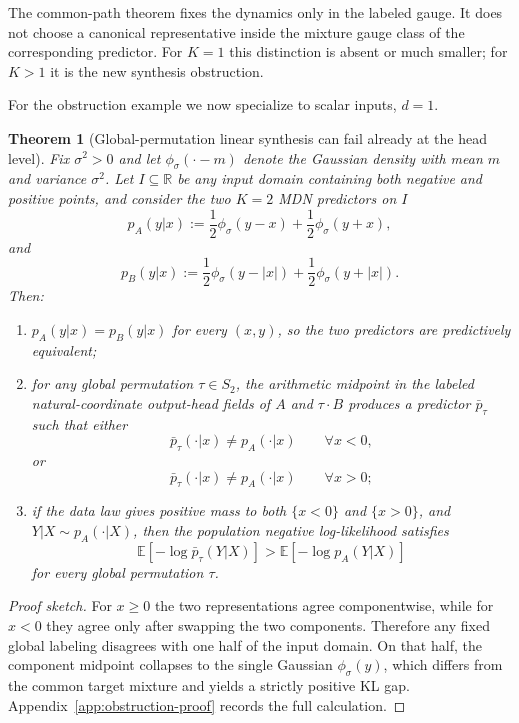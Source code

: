 \documentclass[11pt]{article}
\newtheorem{theorem}{Theorem}
\theoremstyle{definition}
\newcommand{\R}{\mathbb{R}}
\newcommand{\E}{\mathbb{E}}
\begin{document}
The common-path theorem fixes the dynamics only in the labeled gauge. It does
not choose a canonical representative inside the mixture gauge class of the
corresponding predictor. For $K=1$ this distinction is absent or much smaller;
for $K>1$ it is the new synthesis obstruction.

\noindent
For the obstruction example we now specialize to scalar inputs, $d=1$.

\begin{theorem}[Global-permutation linear synthesis can fail already at the head level]
\label{thm:mdn-obstruction}
Fix $\sigma^2>0$ and let $\phi_\sigma(\cdot-m)$ denote the Gaussian density
with mean $m$ and variance $\sigma^2$. Let $I\subseteq \R$ be any input domain
containing both negative and positive points, and consider the two $K=2$ MDN
predictors on $I$
\[
  p_A(y|x)
  :=
  \frac12 \phi_\sigma(y-x)+\frac12 \phi_\sigma(y+x),
\]
and
\[
  p_B(y|x)
  :=
  \frac12 \phi_\sigma(y-|x|)+\frac12 \phi_\sigma(y+|x|).
\]
Then:
\begin{enumerate}[label=(\roman*)]
  \item $p_A(y|x)=p_B(y|x)$ for every $(x,y)$, so the two predictors are
  predictively equivalent;
  \item for any global permutation $\tau\in S_2$, the arithmetic midpoint in
  the labeled natural-coordinate output-head fields of $A$ and $\tau\cdot B$
  produces a predictor $\bar p_\tau$ such that either
  \[
    \bar p_\tau(\cdot|x)\neq p_A(\cdot|x)\qquad \forall x<0,
  \]
  or
  \[
    \bar p_\tau(\cdot|x)\neq p_A(\cdot|x)\qquad \forall x>0;
  \]
  \item if the data law gives positive mass to both $\{x<0\}$ and $\{x>0\}$,
  and $Y|X\sim p_A(\cdot|X)$, then the population negative log-likelihood
  satisfies
  \[
    \E[-\log \bar p_\tau(Y|X)]
    >
    \E[-\log p_A(Y|X)]
  \]
  for every global permutation $\tau$.
\end{enumerate}
\end{theorem}

\begin{proof}[Proof sketch]
For $x\ge 0$ the two representations agree componentwise, while for $x<0$ they
agree only after swapping the two components. Therefore any fixed global
labeling disagrees with one half of the input domain. On that half, the
component midpoint collapses to the single Gaussian $\phi_\sigma(y)$, which
differs from the common target mixture and yields a strictly positive KL gap.
Appendix~\ref{app:obstruction-proof} records the full calculation.
\end{proof}
\end{document}
